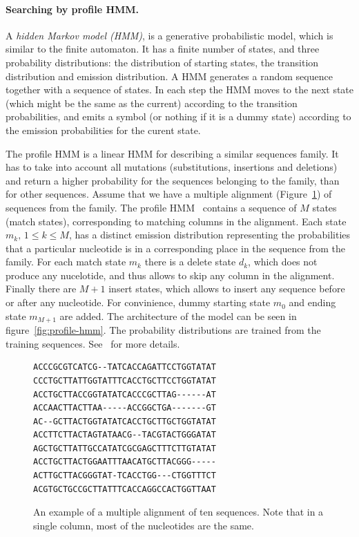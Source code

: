 \paragraph{Searching by profile HMM.}
A \emph{hidden Markov model (HMM)}, is a generative probabilistic model, which is similar to the finite automaton. It has a finite number of states, and three probability distributions: the distribution of starting states, the transition distribution and emission distribution.
A HMM generates a random sequence together with a sequence of states. In each step the HMM moves to the next state (which might be the same as the current) according to the transition probabilities, and emits a symbol (or nothing if it is a dummy state) according to the emission probabilities for the curent state.

The profile HMM is a linear HMM for describing a similar sequences family. It has to take into account all mutations (substitutions, insertions and deletions) and return a higher probability for the sequences belonging to the family, than for other sequences.
Assume that we have a multiple alignment (Figure~\ref{fig:multiple-alignment}) of sequences from the family. The profile HMM~\cite{profile-hmm} contains a sequence of $M$ states (match states), corresponding to matching columns in the alignment. Each state $m_k,\, 1 \leq k \leq M$, has a distinct emission distribution representing the probabilities that a particular nucleotide is in a corresponding place in the sequence from the family.
For each match state $m_k$ there is a delete state $d_k$, which does not produce any nucelotide, and thus allows to skip any column in the alignment. Finally there are $M+1$ insert states, which allows to insert any sequence before or after any nucleotide. For convinience, dummy starting state $m_0$ and ending state $m_{M+1}$ are added.
The architecture of the model can be seen in figure~\ref{fig:profile-hmm}. The probability distributions are trained from the training sequences. See~\cite{profile-hmm} for more details.

\begin{figure}[htp]
\centering
\small
\begin{BVerbatim}
ACCCGCGTCATCG--TATCACCAGATTCCTGGTATAT
CCCTGCTTATTGGTATTTCACCTGCTTCCTGGTATAT
ACCTGCTTACCGGTATATCACCCGCTTAG------AT
ACCAACTTACTTAA-----ACCGGCTGA-------GT
AC--GCTTACTGGTATATCACCTGCTTGCTGGTATAT
ACCTTCTTACTAGTATAACG--TACGTACTGGGATAT
AGCTGCTTATTGCCATATCGCGAGCTTTCTTGTATAT
ACCTGCTTACTGGAATTTAACATGCTTACGGG-----
ACTTGCTTACGGGTAT-TCACCTGG---CTGGTTTCT
ACGTGCTGCCGCTTATTTCACCAGGCCACTGGTTAAT
\end{BVerbatim}
\caption[Multiple alignment]{An example of a multiple alignment of ten sequences. Note that in a single column, most of the nucleotides are the same.}
\label{fig:multiple-alignment}
\end{figure}

